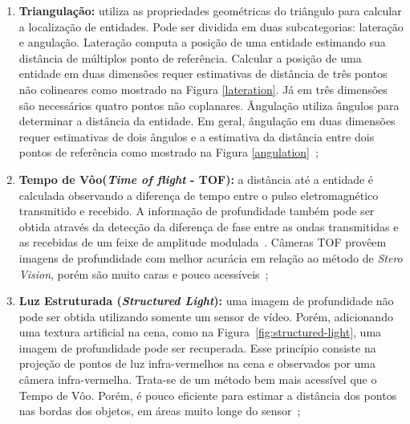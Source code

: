 	\begin{enumerate}
		\item \textbf{Triangulação:} utiliza as propriedades geométricas do triângulo para calcular a localização de entidades. Pode ser dividida em duas subcategorias: lateração e angulação. Lateração computa a posição de uma entidade estimando sua distância de múltiplos ponto de referência. Calcular a posição de uma entidade em duas dimensões requer estimativas de distância de três pontos não colineares como mostrado na Figura \ref{lateration}. Já em três dimensões são necessários quatro pontos não coplanares. Ângulação utiliza ângulos para determinar a distância da entidade. Em geral, ângulação em duas dimensões requer estimativas de dois ângulos e a estimativa da distância entre dois pontos de referência como mostrado na Figura \ref{angulation}~\cite{triangulacao};

		\item \textbf{Tempo de Vôo(\textit{Time of flight} - TOF):} a distância até a entidade é calculada observando a diferença de tempo entre o pulso eletromagnético transmitido e recebido. A informação de profundidade também pode ser obtida através da detecção da diferença de fase entre as ondas transmitidas e as recebidas de um feixe de amplitude modulada~\cite{jain, fall-detection}. Câmeras TOF provêem imagens de profundidade com melhor acurácia em relação ao método de \textit{Stero Vision}, porém são muito caras e pouco acessíveis~\cite{fall-detection};

		\item \textbf{Luz Estruturada (\textit{Structured Light}):} uma imagem de profundidade não pode ser obtida utilizando somente um sensor de vídeo. Porém, adicionando uma textura artificial na cena, como na Figura~\ref{fig:structured-light}, uma imagem de profundidade pode ser recuperada. Esse princípio consiste na projeção de pontos de luz infra-vermelhos na cena e observados por uma câmera infra-vermelha. Trata-se de um método bem mais acessível que o Tempo de Vôo. Porém, é pouco eficiente para estimar a distância dos pontos nas bordas dos objetos, em áreas muito longe do sensor~\cite{fall-detection};
	\end{enumerate}

